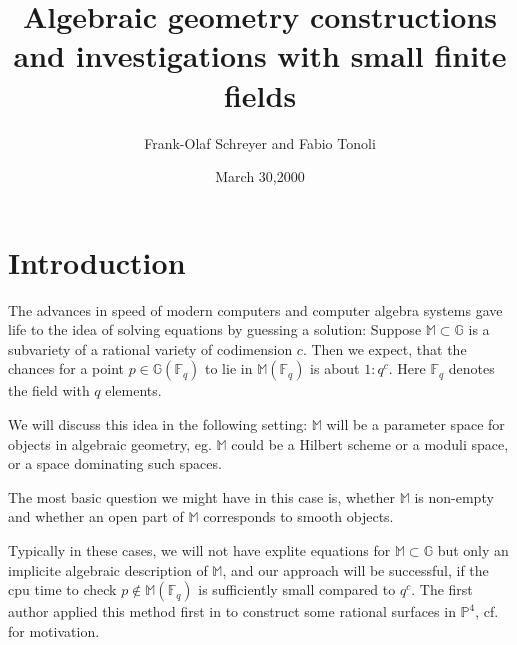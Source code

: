 \documentclass[12pt,leqno]{amsart}
\title[Algebraic geometry constructions ...]
{Algebraic geometry constructions and investigations with small finite fields}
\author{ Frank-Olaf Schreyer and Fabio Tonoli}
\date{March 30,2000}
\newcommand{\FF}{{\mathbb F}}
\newcommand{\GG}{{\mathbb G}}
\newcommand{\MM}{{\mathbb M}}
\newcommand{\PP}{{\mathbb P}}
\newlength{\br}
\newlength{\ho}
\begin{document}
\newtheorem{lemma}{Lemma}[section]
\newtheorem{proposition}[lemma]{Proposition}
\newtheorem{theorem}[lemma]{Theorem}
\newtheorem{corollary}[lemma]{Corollary}
\newtheorem{conjecture}[lemma]{Conjecture}

\theoremstyle{definition}
\newtheorem{definition}[lemma]{Definition}
\newtheorem{remark}{Remark}[section]
\newtheorem{example}{Example}[section]
\newtheorem{exercise}{Exercise}[section]
\newtheorem{algorithm}{Algorithm}[subsection]
\newtheorem{sub}[subsubsection]{}



\maketitle

\begin{abstract}
\end{abstract}
 
\tableofcontents



\section{Introduction}

The advances in speed of modern computers and computer algebra systems gave 
life to the idea of solving  equations by guessing a solution:
Suppose $\MM \subset \GG$ is a subvariety of a rational variety
of codimension $c$. Then we expect, that the chances for a point 
$p \in \GG(\FF_q)$ to lie in $\MM(\FF_q)$ is about $1:q^c$. Here $\FF_q$
denotes the field with $q$ elements.  

We will discuss this idea in the following setting: $\MM$ will be 
a parameter space for objects in algebraic geometry, eg. $\MM$ could be
a Hilbert scheme or a moduli space, or a space dominating such spaces.

The most basic question we might have in this case is, whether $\MM$ is 
non-empty and whether an open part of $\MM$ corresponds to smooth objects.

Typically in these cases,
we will not have explite equations for $\MM \subset \GG$
but only an implicite algebraic description of $\MM$, and our approach will
be successful, if the cpu time to check $p \notin \MM(\FF_q)$ is sufficiently
small compared to $q^c$.
The first author applied this method first in \cite{Sch1} to construct some
rational surfaces in $\PP^4$, cf. \cite{ElPe,DS} for motivation.
\end{document}
